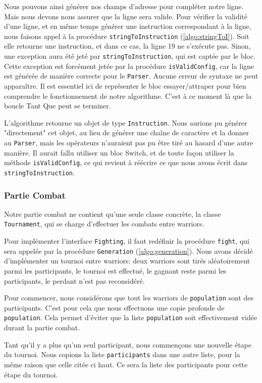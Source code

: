 \documentclass[hidelinks]{report}
\begin{document}
Nous pouvons ainsi générer nos champs d'adresse pour compléter notre ligne. Mais nous devons nous assurer que la ligne sera valide. 
Pour vérifier la validité d'une ligne, et en même temps générer une instruction correspondant à la ligne, nous faisons appel à la procédure \texttt{stringToInstruction} (\autoref{algo:stringToI}). Soit elle retourne une instruction, et dans ce cas, la ligne 19 ne s'exécute pas. Sinon, une exception aura été jeté par \texttt{stringToInstruction}, qui est captée par le bloc. Cette exception est forcément jetée par la procédure \texttt{isValidConfig}, car la ligne est générée de manière correcte pour le \texttt{Parser}. Aucune erreur de syntaxe ne peut apparaître. Il est essentiel ici de représenter le bloc essayer/attraper pour bien comprendre le fonctionnement de notre algorithme. C'est à ce moment là que la boucle Tant Que peut se terminer.

L'algorithme retourne un objet de type \texttt{Instruction}. Nous aurions pu générer "directement" cet objet, au lieu de générer une chaîne de caractère et la donner au \texttt{Parser}, mais les opérateurs n'auraient pas pu être tiré au hasard d'une autre manière. Il aurait fallu utiliser un bloc Switch, et de toute façon utiliser la méthode \texttt{isValidConfig}, ce qui revient à réécrire ce que nous avons écrit dans \texttt{stringToInstruction}.
\subsubsection{Partie Combat\label{subsubsec:combat}}

Notre partie combat ne contient qu'une seule classe concrète, la classe \texttt{Tournament}, qui se charge d'effectuer les combats entre warriors. 

Pour implémenter l'interface \texttt{Fighting}, il faut redéfinir la procédure \texttt{fight}, qui sera appelée par la procédure \texttt{Generation} (\autoref{algo:generation}). Nous avons décidé d'implémenter un tournoi entre warriors: deux warriors sont tirés aléatoirement parmi les participants, le tournoi est effectué, le gagnant reste parmi les participants, le perdant n'est pas reconsidéré.

Pour commencer, nous considérons que tout les warriors de \texttt{population} sont des participants. C'est pour cela que nous effectuons une copie profonde de \texttt{population}. Cela permet d'éviter que la liste \texttt{population} soit effectivement vidée durant la partie combat.

Tant qu'il y a plus qu'un seul participant, nous commençons une nouvelle étape du tournoi. Nous copions la liste \texttt{participants} dans une autre liste, pour la même raison que celle citée ci haut. Ce sera la liste des participants pour cette étape du tournoi.
\end{document}
